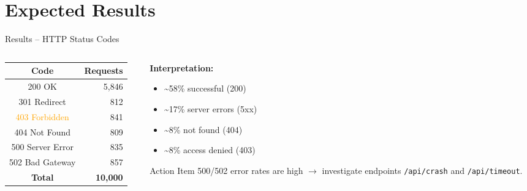 \documentclass[aspectratio=169, 11pt]{beamer}
\begin{document}
\section{Expected Results}

\begin{frame}{Results -- HTTP Status Codes}
  \begin{columns}[T]
    \begin{column}{0.45\textwidth}
      \begin{table}
        \centering
        \begin{tabular}{cr}
          \toprule
          \textbf{Code} & \textbf{Requests} \\
          \midrule
          \textcolor{hadoopGreen}{200 OK} & 5,846 \\
          \textcolor{hadoopBlue}{301 Redirect} & 812 \\
          \textcolor{orange}{403 Forbidden} & 841 \\
          \textcolor{hadoopYellow!80!black}{404 Not Found} & 809 \\
          \textcolor{hadoopRed}{500 Server Error} & 835 \\
          \textcolor{hadoopRed!70}{502 Bad Gateway} & 857 \\
          \midrule
          \textbf{Total} & \textbf{10,000} \\
          \bottomrule
        \end{tabular}
      \end{table}
    \end{column}
    \begin{column}{0.5\textwidth}
      \textbf{Interpretation:}
      \begin{itemize}
        \item \textasciitilde58\% successful (200)
        \item \textasciitilde17\% server errors (5xx)
        \item \textasciitilde8\% not found (404)
        \item \textasciitilde8\% access denied (403)
      \end{itemize}

      \vspace{0.5em}
      \begin{alertblock}{\scriptsize Action Item}
        500/502 error rates are high $\rightarrow$ investigate endpoints \texttt{/api/crash} and \texttt{/api/timeout}.
      \end{alertblock}
    \end{column}
  \end{columns}
\end{frame}
\end{document}
